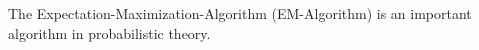 The Expectation-Maximization-Algorithm (EM-Algorithm) is an important algorithm in probabilistic theory. \cite{Schwartz2014}